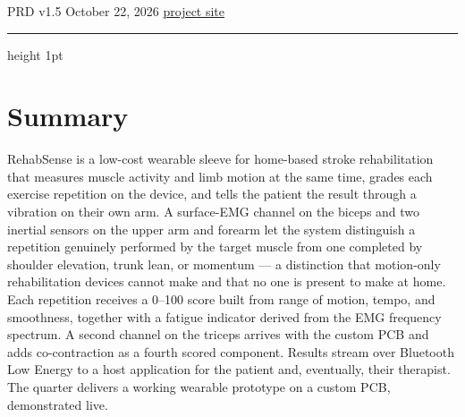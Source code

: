 \documentclass[11pt]{article}
\begin{document}
\begin{center}
{\LARGE\bfseries \ProjectTitle}\\[2pt]
{\large\color{soft} \ProjectSub}\\[10pt]
{\small \CourseLine}\\[2pt]
{\small \TeamLine}\\[2pt]
{\small\color{soft} \InstructorLine}\\[2pt]
{\small\color{soft} PRD v1.5 \quad\textbullet\quad October 22, 2026 \quad\textbullet\quad
\href{https://sites.google.com/uw.edu/ee542group1-rehabsense/timeline}{project site}}
\end{center}
\vspace{4pt}
{\color{rule}\hrule height 1pt}
\vspace{10pt}

\section{Summary}

RehabSense is a low-cost wearable sleeve for home-based stroke rehabilitation
that measures muscle activity and limb motion at the same time, grades each
exercise repetition on the device, and tells the patient the result through a
vibration on their own arm. A surface-EMG channel on the biceps and two
inertial sensors on the upper arm and forearm let the system distinguish a
repetition genuinely performed by the target muscle from one completed by
shoulder elevation, trunk lean, or momentum --- a distinction that motion-only
rehabilitation devices cannot make and that no one is present to make at home.
Each repetition receives a 0--100 score built from range of motion, tempo, and
smoothness, together with a fatigue indicator derived from the EMG frequency
spectrum. A second channel on the triceps arrives with the custom PCB and adds
co-contraction as a fourth scored component. Results stream over Bluetooth Low Energy to a host
application for the patient and, eventually, their therapist. The quarter
delivers a working wearable prototype on a custom PCB, demonstrated live.
\end{document}

